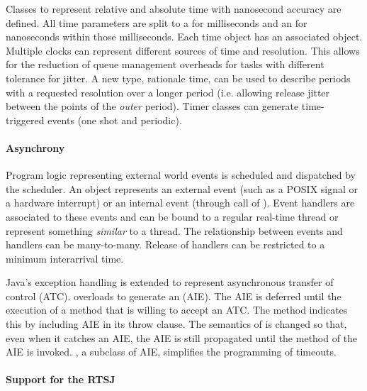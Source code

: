 Classes to represent relative and absolute time with nanosecond
accuracy are defined. All time parameters are split to a 
for milliseconds and an  for nanoseconds within those
milliseconds. Each time object has an associated 
object. Multiple clocks can represent different sources of time and
resolution. This allows for the reduction of queue management
overheads for tasks with different tolerance for jitter. A new type,
rationale time, can be used to describe periods with a requested
resolution over a longer period (i.e. allowing release jitter
between the points of the \textit{outer} period). Timer classes can
generate time-triggered events (one shot and periodic).

\paragraph{Asynchrony}

Program logic representing external world events is scheduled and
dispatched by the scheduler. An  object represents
an external event (such as a POSIX signal or a hardware interrupt)
or an internal event (through call of ). Event handlers
are associated to these events and can be bound to a regular
real-time thread or represent something \textit{similar} to a
thread. The relationship between events and handlers can be
many-to-many. Release of handlers can be restricted to a minimum
interarrival time.


Java's exception handling is extended to represent asynchronous
transfer of control (ATC).  overloads
 to generate an
 (AIE). The AIE is deferred
until the execution of a method that is willing to accept an ATC.
The method indicates this by including AIE in its throw clause. The
semantics of  is changed so that, even when it catches
an AIE, the AIE is still propagated until the 
method of the AIE is invoked. , a subclass of AIE,
simplifies the programming of timeouts.

\paragraph{Support for the RTSJ}

